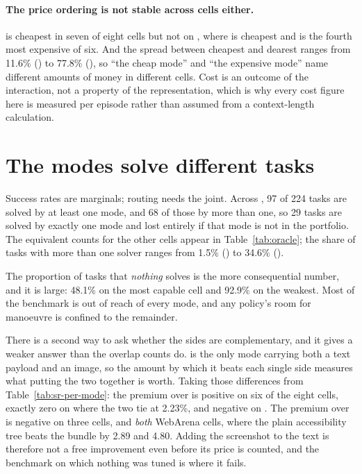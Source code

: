 \paragraph{The price ordering is not stable across cells either.} \mVis{} is
cheapest in seven of eight cells but not on , where
\mDOM{} is cheapest and \mVis{} is the fourth most expensive of six. And the
spread between cheapest and dearest ranges from 11.6\% () to
77.8\% (), so ``the cheap mode'' and ``the expensive
mode'' name different amounts of money in different cells. Cost is an outcome of
the interaction, not a property of the representation, which is why every cost figure here is measured per episode rather than assumed from a
context-length calculation.

\FloatBarrier
\section{The modes solve different tasks}
\label{sec:complementarity}

Success rates are marginals; routing needs the joint. Across
, 97 of 224 tasks are solved by at least one mode, and 68 of those by more than one, so 29 tasks are solved by exactly one mode and lost
entirely if that mode is not in the portfolio. The equivalent counts for the
other cells appear in Table~\ref{tab:oracle}; the share of tasks with more than
one solver ranges from 1.5\% () to 34.6\%
().

The proportion of tasks that \emph{nothing} solves is the more consequential
number, and it is large: 48.1\% on the most capable cell and 92.9\% on the
weakest. Most of the benchmark is out of reach of every mode, and any policy's
room for manoeuvre is confined to the remainder.

There is a second way to ask whether the sides are complementary, and it gives a
weaker answer than the overlap counts do. \mSoM{} is the only mode carrying both
a text payload and an image, so the amount by which it beats each single side
measures what putting the two together is worth. Taking those differences from
Table~\ref{tab:sr-per-mode}: the premium over \mVis{} is positive on six of the
eight cells, exactly zero on  where the two tie at 2.23\%,
and negative on . The premium over \mDOM{} is negative on
three cells,  and \emph{both} WebArena cells, where the
plain accessibility tree beats the bundle by 2.89 and 4.80\pp. Adding the
screenshot to the text is therefore not a free improvement even before its price
is counted, and the benchmark on which nothing was tuned is where it fails.

